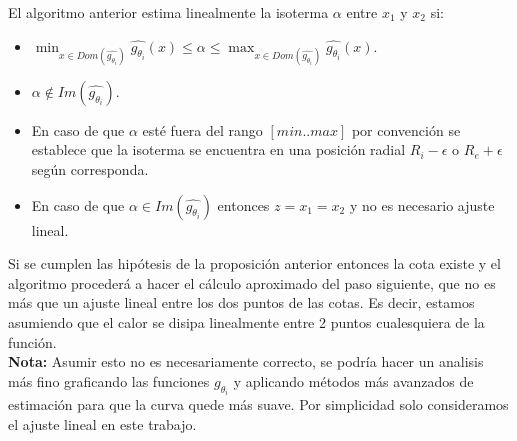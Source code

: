 \begin{proposition}
    El algoritmo anterior estima linealmente la isoterma $\alpha$ entre $x_1$ y $x_2$ si:
    \begin{itemize}
        \item $\displaystyle\min_{x \in Dom(\hat{g_{\theta_i}})}{\hat{g_{\theta_i}}(x)} \leq \alpha \leq \displaystyle\max_{x \in Dom(\hat{g_{\theta_i}})}{\hat{g_{\theta_i}}(x)}$.
        \item $\alpha \notin Im(\hat{g_{\theta_i}})$.
    \end{itemize}
    \begin{itemize}
        \item En caso de que $\alpha$ esté fuera del rango $[min..max]$ por convención se establece que la isoterma se encuentra en una posición radial $R_i - \epsilon$ o $R_e + \epsilon$ según corresponda.
        \item En caso de que $\alpha \in Im(\hat{g_{\theta_i}})$ entonces $z = x_1 = x_2$ y no es necesario ajuste lineal.
    \end{itemize}
\end{proposition}
\begin{proposition}
    Si se cumplen las hipótesis de la proposición anterior entonces la cota existe y el algoritmo procederá a hacer el cálculo aproximado del paso siguiente, que no es más que un ajuste lineal entre los dos puntos de las cotas. Es decir, estamos asumiendo que el calor se disipa linealmente entre 2 puntos cualesquiera de la función.\\
    \vspace{0.3cm}
    \textbf{Nota:} Asumir esto no es necesariamente correcto, se podría hacer un analisis más fino graficando las funciones $g_{\theta_i}$ y aplicando métodos más avanzados de estimación para que la curva quede más suave. Por simplicidad solo consideramos el ajuste lineal en este trabajo.
\end{proposition}

